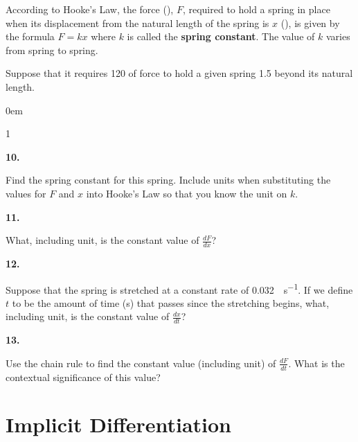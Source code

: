 \documentclass[12pt,]{book}
\newcommand{\terminology}[1]{\textbf{#1}}
\theoremstyle{plain}
\theoremstyle{definition}
\numberwithin{equation}{section}
\newenvironment{exercisegroup}%
{\medskip\noindent}%
{\par\bigskip}%
\newlength{\exercisegroupindent}%
\newlength{\exercisegroupitemwidth}%
\newenvironment{exercisegrouplist}%
{\vspace{-\partopsep}%
\begin{adjustwidth}{\exercisegroupindent}{0em}}%
{\end{adjustwidth}%
\vspace{-\partopsep}%
\vspace{\baselineskip}}%
\newenvironment{exercisegroupbycol}[1]%
{\begin{exercisegrouplist}%
\vspace{-\multicolsep}%
\begin{multicols}{#1}%
\setlength{\parindent}{0em}%
\setlength{\exercisegroupitemwidth}{\linewidth}}%
{\end{multicols}%
\vspace{-\multicolsep}%
\end{exercisegrouplist}}%
\newenvironment{exercisegroupitem}[1]%
{\begin{minipage}[t]{\exercisegroupitemwidth}
\vspace{0pt}%
{\bfseries#1}%
\rule{0pt}{\baselineskip}}{\strut%
\end{minipage}%
\hspace{\columnsep}}%
\providecommand\phantomsection{}
\newcommand{\lz}[2]{\frac{d#1}{d#2}}
\begin{document}
\begin{exercisegroup}%
According to Hooke's Law, the force (\si{\pound}), \(F\), required to hold a spring in place when its displacement from the natural length of the spring is \(x\) (\si{\foot}), is given by the formula \(F=kx\) where \(k\) is called the \terminology{spring constant}.  The value of \(k\) varies from spring to spring.%
\par
Suppose that it requires \SI{120}{\pound} of force to hold a given spring \SI{1.5}{\foot} beyond its natural length.%
\par
\begin{exercisegroupbycol}{1}%
\begin{exercisegroupitem}{10. }\phantomsection\hypertarget{exercise-374}{\null}
Find the spring constant for this spring. Include units when substituting the values for \(F\) and \(x\) into Hooke's Law so that you know the unit on \(k\).%
\end{exercisegroupitem}%
\par%
\begin{exercisegroupitem}{11. }\phantomsection\hypertarget{exercise-375}{\null}
What, including unit, is the constant value of \(\lz{F}{x}\)?%
\end{exercisegroupitem}%
\par%
\begin{exercisegroupitem}{12. }\phantomsection\hypertarget{exercise-376}{\null}
Suppose that the spring is stretched at a constant rate of \SI{0.032}{\foot\per\second}.  If we define \(t\) to be the amount of time (\si{\second}) that passes since the stretching begins, what, including unit, is the constant value of \(\lz{x}{t}\)?%
\end{exercisegroupitem}%
\par%
\begin{exercisegroupitem}{13. }\phantomsection\hypertarget{exercise-377}{\null}
Use the chain rule to find the constant value (including unit) of \(\lz{F}{t}\).  What is the contextual significance of this value?%
\end{exercisegroupitem}%
\par%
\end{exercisegroupbycol}%
\end{exercisegroup}%
\typeout{************************************************}
\typeout{************************************************}
\chapter[Implicit Differentiation]{Implicit Differentiation}\label{chapter-implicit-differentiation}
\typeout{************************************************}
\typeout{************************************************}
\end{document}
